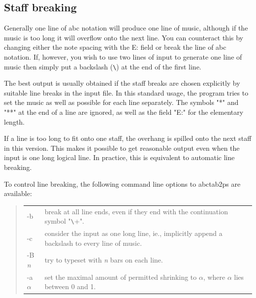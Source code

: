 \documentclass[a4paper]{article}
\begin{document}
\subsection{Staff breaking}
 
Generally one line of abc  notation  will  produce  one  line  of
music,  although  if  the music is too long it will overflow onto
the next line. You can counteract this by changing either the note 
spacing with  the  E: field or break the line of abc notation. If, 
however, you wish to use two  lines  of input  to  generate  one  
line  of  music  then simply put a backslash (\verb+\+) at the 
end  of the first line.
\par
The best output is usually obtained if the staff breaks are
chosen explicitly by suitable line breaks in the input file.
In this standard usage, the program tries to set the music as well 
as possible for each line separately. The symbols "*" and "**" at 
the end of a line are ignored, as well as the field "E:" for
the elementary length.
\par
If a line is too long to fit onto one staff, the overhang 
is spilled onto the next staff in this version. This makes it possible 
to get reasonable output even when the input is one long logical line. 
In practice, this is equivalent to automatic line breaking. 
\par
To control line breaking, the following command line options to
abctab2ps are available:
\begin{quote}
\begin{tabular}{lp{10cm}}
 -b  & break at all line ends, even if they end with the
       continuation symbol "\verb+\+". \\
 -c  & consider the input as one long line, ie., implicitly append 
       a backslash to every line of music. \\
 -B {\it n} & try to typeset with {\it n} bars on each line.\\
 -a $\alpha$ & set the maximal amount of permitted shrinking to $\alpha$,
       where $\alpha$ lies between 0 and 1.
\end{tabular}
\end{quote}
\end{document}
